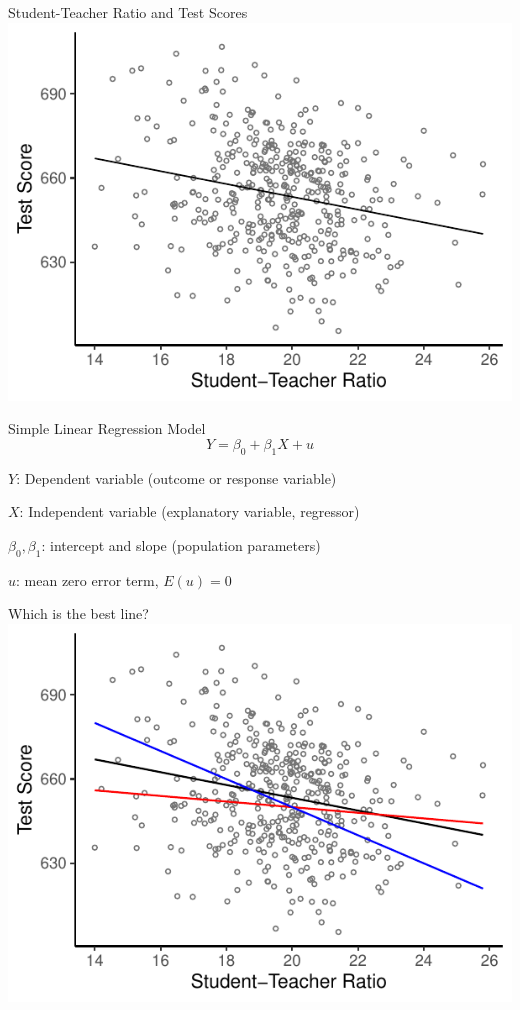 \documentclass{./../div_teaching_slides}
\begin{document}
\begin{frame}{Student-Teacher Ratio and Test Scores}
\centering
\includegraphics{./../../output/lrm_caschool_scatter2.pdf}
\end{frame}

\begin{frame}{Simple Linear Regression Model}
$$ Y = \beta_0 + \beta_1 X + u $$
\vspace{1em}
\begin{witemize}
  \item $Y$: Dependent variable (outcome or response variable)  \item $X$: Independent variable (explanatory variable, regressor)
  \item $\beta_0, \beta_1$: intercept and slope (population parameters)
  \item $u$: mean zero error term, $E(u)=0$
\end{witemize}
\end{frame}

\begin{frame}{Which is the best line?}
\centering
\includegraphics{./../../output/lrm_caschool_bestline.pdf}
\end{frame}
\end{document}
